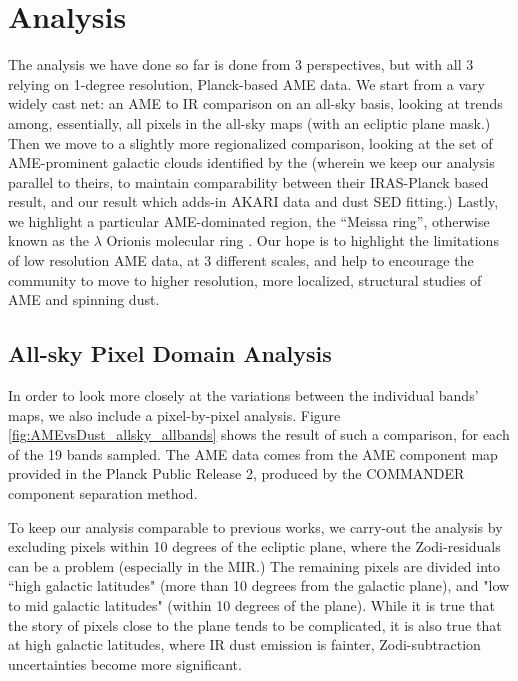 \documentclass[preprint2,longabstract]{aastex}
\begin{document}
\section{Analysis}

The analysis we have done so far is done from 3 perspectives, but with all 3 relying on 1-degree resolution, Planck-based AME data. We start from a vary widely cast net: an AME to IR comparison on an all-sky basis, looking at trends among, essentially, all pixels in the all-sky maps (with an ecliptic plane mask.) Then we move to a slightly more regionalized comparison, looking at the set of AME-prominent galactic clouds identified by the \cite{planckXV} (wherein we keep our analysis parallel to theirs, to maintain comparability between their IRAS-Planck based result, and our result which adds-in AKARI data and dust SED fitting.) Lastly, we highlight a particular AME-dominated region, the ``Meissa ring'', otherwise known as the $\lambda$ Orionis molecular ring \citep{maddalena86,maddalena87}. Our hope is to highlight the limitations of low resolution AME data, at 3 different scales, and help to encourage the community to move to higher resolution, more localized, structural studies of AME and spinning dust.

\subsection{All-sky Pixel Domain Analysis}

	In order to look more closely at the variations between the individual bands' maps, we also include a pixel-by-pixel analysis. Figure \ref{fig:AMEvsDust_allsky_allbands} shows the result of such a comparison, for each of the 19 bands sampled. The AME data comes from the AME component map provided in the Planck Public Release 2, produced by the COMMANDER component separation method.

    To keep our analysis comparable to previous works, we carry-out the analysis by excluding pixels within 10 degrees of the ecliptic plane, where the Zodi-residuals can be a problem (especially in the MIR.) The remaining pixels are divided into ``high galactic latitudes" (more than 10 degrees from the galactic plane), and "low to mid galactic latitudes" (within 10 degrees of the plane).  While it is true that the story of pixels close to the plane tends to be complicated, it is also true that at high galactic latitudes, where IR dust emission is fainter, Zodi-subtraction uncertainties become more significant.
\end{document}
